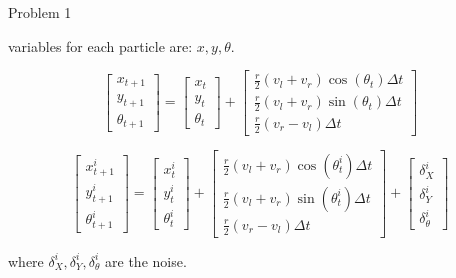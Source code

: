 \documentclass{article}
\begin{document}
\begin{problem}{Problem 1}

\begin{problem}{1.1}
variables for each particle are: $x, y, \theta$.
\end{problem}
\begin{problem}{1.2}
\[
    \begin{bmatrix}
        x_{t+1} \\
        y_{t+1} \\
        \theta_{t+1}
    \end{bmatrix}
    =
    \begin{bmatrix}
        x_t \\
        y_t \\
        \theta_t
    \end{bmatrix}
    +
    \begin{bmatrix}
        \frac{r}{2} (v_l + v_r) \cos(\theta_t) \Delta t \\
        \frac{r}{2} (v_l + v_r) \sin(\theta_t) \Delta t \\
        \frac{r}{2} (v_r - v_l) \Delta t
    \end{bmatrix}
\]
\end{problem}

\begin{problem}{1.3}
\[
    \begin{bmatrix}
        x_{t+1}^i \\
        y_{t+1}^i \\
        \theta_{t+1}^i
    \end{bmatrix}
    =
    \begin{bmatrix}
        x_t^i \\
        y_t^i \\
        \theta_t^i
    \end{bmatrix}
    +
    \begin{bmatrix}
        \frac{r}{2}(v_l + v_r) \cos(\theta_t^i) \Delta t \\
        \frac{r}{2}(v_l + v_r) \sin(\theta_t^i) \Delta t \\
        \frac{r}{2}(v_r - v_l) \Delta t
    \end{bmatrix}
    +
    \begin{bmatrix}
        \delta_X^i \\
        \delta_Y^i \\
        \delta_\theta^i
    \end{bmatrix}
\]

where $\delta_X^i, \delta_Y^i, \delta_\theta^i$ are the noise.
\end{problem}


\end{problem}
\end{document}
